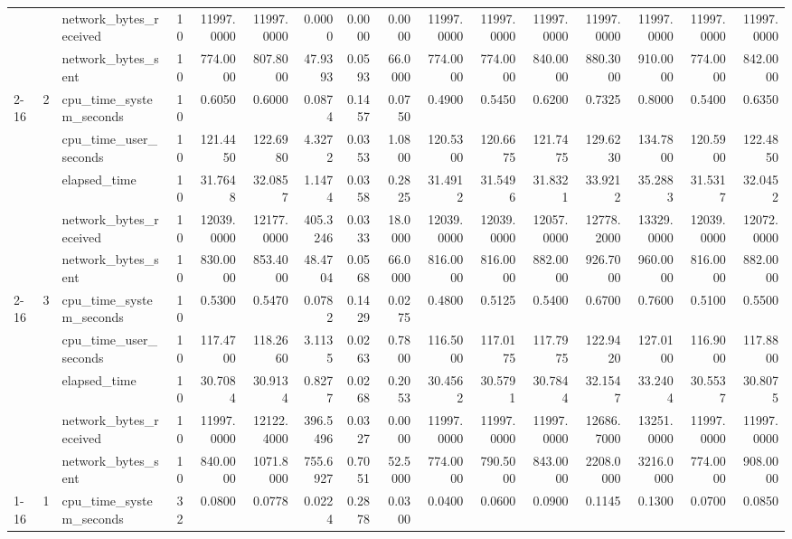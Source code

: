 \begin{tabular}{lllrrrrrrrrrrrrr}
 &  & network\_bytes\_received & 10 & 11997.0000 & 11997.0000 & 0.0000 & 0.0000 & 0.0000 & 11997.0000 & 11997.0000 & 11997.0000 & 11997.0000 & 11997.0000 & 11997.0000 & 11997.0000 \\
 &  & network\_bytes\_sent & 10 & 774.0000 & 807.8000 & 47.9393 & 0.0593 & 66.0000 & 774.0000 & 774.0000 & 840.0000 & 880.3000 & 910.0000 & 774.0000 & 842.0000 \\
\cline{2-16}
 & \multirow[t]{5}{*}{2} & cpu\_time\_system\_seconds & 10 & 0.6050 & 0.6000 & 0.0874 & 0.1457 & 0.0750 & 0.4900 & 0.5450 & 0.6200 & 0.7325 & 0.8000 & 0.5400 & 0.6350 \\
 &  & cpu\_time\_user\_seconds & 10 & 121.4450 & 122.6980 & 4.3272 & 0.0353 & 1.0800 & 120.5300 & 120.6675 & 121.7475 & 129.6230 & 134.7800 & 120.5900 & 122.4850 \\
 &  & elapsed\_time & 10 & 31.7648 & 32.0857 & 1.1474 & 0.0358 & 0.2825 & 31.4912 & 31.5496 & 31.8321 & 33.9212 & 35.2883 & 31.5317 & 32.0452 \\
 &  & network\_bytes\_received & 10 & 12039.0000 & 12177.0000 & 405.3246 & 0.0333 & 18.0000 & 12039.0000 & 12039.0000 & 12057.0000 & 12778.2000 & 13329.0000 & 12039.0000 & 12072.0000 \\
 &  & network\_bytes\_sent & 10 & 830.0000 & 853.4000 & 48.4704 & 0.0568 & 66.0000 & 816.0000 & 816.0000 & 882.0000 & 926.7000 & 960.0000 & 816.0000 & 882.0000 \\
\cline{2-16}
 & \multirow[t]{5}{*}{3} & cpu\_time\_system\_seconds & 10 & 0.5300 & 0.5470 & 0.0782 & 0.1429 & 0.0275 & 0.4800 & 0.5125 & 0.5400 & 0.6700 & 0.7600 & 0.5100 & 0.5500 \\
 &  & cpu\_time\_user\_seconds & 10 & 117.4700 & 118.2660 & 3.1135 & 0.0263 & 0.7800 & 116.5000 & 117.0175 & 117.7975 & 122.9420 & 127.0100 & 116.9000 & 117.8800 \\
 &  & elapsed\_time & 10 & 30.7084 & 30.9134 & 0.8277 & 0.0268 & 0.2053 & 30.4562 & 30.5791 & 30.7844 & 32.1547 & 33.2404 & 30.5537 & 30.8075 \\
 &  & network\_bytes\_received & 10 & 11997.0000 & 12122.4000 & 396.5496 & 0.0327 & 0.0000 & 11997.0000 & 11997.0000 & 11997.0000 & 12686.7000 & 13251.0000 & 11997.0000 & 11997.0000 \\
 &  & network\_bytes\_sent & 10 & 840.0000 & 1071.8000 & 755.6927 & 0.7051 & 52.5000 & 774.0000 & 790.5000 & 843.0000 & 2208.0000 & 3216.0000 & 774.0000 & 908.0000 \\
\cline{1-16} \cline{2-16}
\multirow[t]{15}{*}{point-in-polygon-lookup-duckdb-small} & \multirow[t]{5}{*}{1} & cpu\_time\_system\_seconds & 32 & 0.0800 & 0.0778 & 0.0224 & 0.2878 & 0.0300 & 0.0400 & 0.0600 & 0.0900 & 0.1145 & 0.1300 & 0.0700 & 0.0850 \\

\end{tabular}
